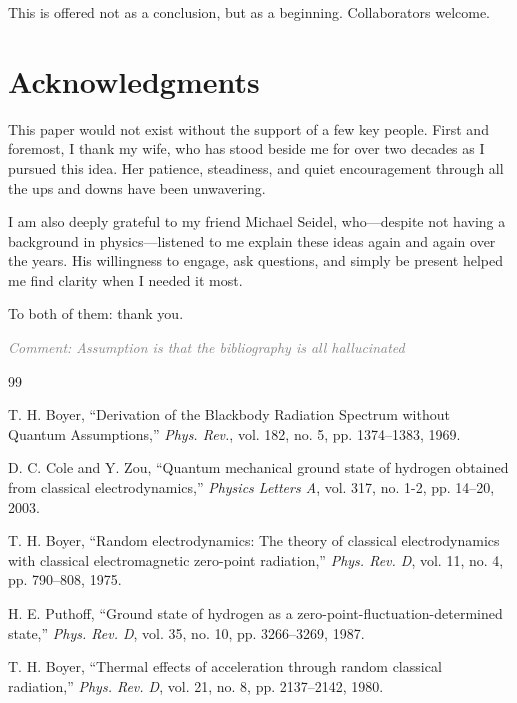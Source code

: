 \documentclass {article}
\newcommand{\comment}[1]{\textcolor{gray}{\small\textit{Comment: #1}}}
\begin{document}
This is offered not as a conclusion, but as a beginning. Collaborators welcome.


\section*{Acknowledgments}

This paper would not exist without the support of a few key people. First and foremost, I thank my wife, who has stood beside me for over two decades as I pursued this idea. Her patience, steadiness, and quiet encouragement through all the ups and downs have been unwavering.

I am also deeply grateful to my friend Michael Seidel, who—despite not having a background in physics—listened to me explain these ideas again and again over the years. His willingness to engage, ask questions, and simply be present helped me find clarity when I needed it most.

To both of them: thank you.


\comment{Assumption is that the bibliography is all hallucinated}

\begin{thebibliography}{99}
	

	
	T. H. Boyer, “Derivation of the Blackbody Radiation Spectrum without Quantum Assumptions,” \textit{Phys. Rev.}, vol. 182, no. 5, pp. 1374–1383, 1969.
	
	D. C. Cole and Y. Zou, “Quantum mechanical ground state of hydrogen obtained from classical electrodynamics,” \textit{Physics Letters A}, vol. 317, no. 1-2, pp. 14–20, 2003.
	
	T. H. Boyer, “Random electrodynamics: The theory of classical electrodynamics with classical electromagnetic zero-point radiation,” \textit{Phys. Rev. D}, vol. 11, no. 4, pp. 790–808, 1975.
	
	H. E. Puthoff, “Ground state of hydrogen as a zero-point-fluctuation-determined state,” \textit{Phys. Rev. D}, vol. 35, no. 10, pp. 3266–3269, 1987.
	
	T. H. Boyer, “Thermal effects of acceleration through random classical radiation,” \textit{Phys. Rev. D}, vol. 21, no. 8, pp. 2137–2142, 1980.
	
\end{thebibliography}
\end{document}
